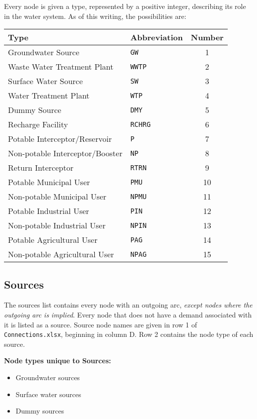 \documentclass[11pt]{article}
\newcommand{\connections}{\texttt{Connections.xlsx}}
\begin{document}
Every node is given a type, represented by a positive integer, describing its role in the water system.
As of this writing, the possibilities are:
\begin{center}
	\begin{tabular}{|l|l|c|}
		\hline
		Type										& Abbreviation		& Number \\
		\hline
		Groundwater Source					& \texttt{GW}		& 1 \\
		Waste Water Treatment Plant		& \texttt{WWTP}	& 2 \\
		Surface Water Source					& \texttt{SW}		& 3 \\
		Water Treatment Plant				& \texttt{WTP}		& 4 \\
		Dummy Source							& \texttt{DMY}		& 5 \\
		Recharge Facility						& \texttt{RCHRG}	& 6 \\
		Potable Interceptor/Reservoir		& \texttt{P}		& 7 \\
		Non-potable Interceptor/Booster	& \texttt{NP}		& 8 \\
		Return Interceptor					& \texttt{RTRN}	& 9 \\
		Potable Municipal User				& \texttt{PMU}		& 10 \\
		Non-potable Municipal User			& \texttt{NPMU}	& 11 \\
		Potable Industrial User				& \texttt{PIN}		& 12 \\
		Non-potable Industrial User		& \texttt{NPIN}	& 13 \\
		Potable Agricultural User			& \texttt{PAG}		& 14 \\
		Non-potable Agricultural User		& \texttt{NPAG}	& 15 \\
		\hline
	\end{tabular}
\end{center}

\subsection{Sources}
\label{ssec:sources}

The sources list contains every node with an outgoing arc, \emph{except nodes where the outgoing arc is implied}.
Every node that does not have a demand associated with it is listed as a source.
Source node names are given in row 1 of \connections, beginning in column D.
Row 2 contains the node type of each source.

\textbf{Node types unique to Sources:}
\begin{itemize}
	\item Groundwater sources
	\item Surface water sources
	\item Dummy sources
\end{itemize}
\end{document}
